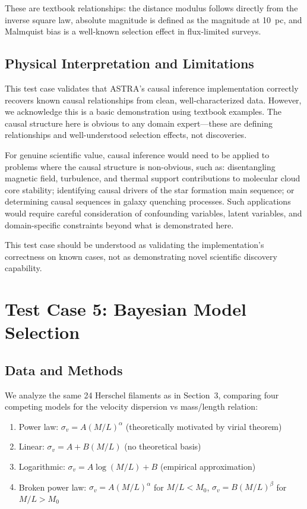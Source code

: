 \documentclass[usenatbib]{rasti}
\begin{document}
These are textbook relationships: the distance modulus follows directly from the inverse square law, absolute magnitude is defined as the magnitude at 10~pc, and Malmquist bias is a well-known selection effect in flux-limited surveys.

\subsection{Physical Interpretation and Limitations}

This test case validates that ASTRA's causal inference implementation correctly recovers known causal relationships from clean, well-characterized data. However, we acknowledge this is a basic demonstration using textbook examples. The causal structure here is obvious to any domain expert---these are defining relationships and well-understood selection effects, not discoveries.

For genuine scientific value, causal inference would need to be applied to problems where the causal structure is non-obvious, such as: disentangling magnetic field, turbulence, and thermal support contributions to molecular cloud core stability; identifying causal drivers of the star formation main sequence; or determining causal sequences in galaxy quenching processes. Such applications would require careful consideration of confounding variables, latent variables, and domain-specific constraints beyond what is demonstrated here.

This test case should be understood as validating the implementation's correctness on known cases, not as demonstrating novel scientific discovery capability.

\section{Test Case 5: Bayesian Model Selection}

\subsection{Data and Methods}

We analyze the same 24 Herschel filaments as in Section~3, comparing four competing models for the velocity dispersion vs mass/length relation:
\begin{enumerate}
\item Power law: $\sigma_v = A (M/L)^\alpha$ (theoretically motivated by virial theorem)
\item Linear: $\sigma_v = A + B (M/L)$ (no theoretical basis)
\item Logarithmic: $\sigma_v = A \log(M/L) + B$ (empirical approximation)
\item Broken power law: $\sigma_v = A (M/L)^\alpha$ for $M/L < M_0$, $\sigma_v = B (M/L)^\beta$ for $M/L > M_0$
\end{enumerate}
\end{document}
